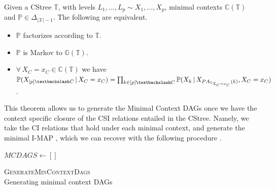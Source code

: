 \documentclass{tufte-book}
\begin{document}
\begin{theorem}\label{thm:markovtheoremcstrees}
Given a CStree $\mathbb{T}$, with levels $L_1,...,L_p \sim X_1,...,X_p$, minimal contexts $\mathbb{C}(\mathbb{T})$ and $\mathbb{P} \in \Delta_{|\mathcal{X}|-1}$. The following are equivalent.
\begin{itemize}
\item $\mathbb{P}$ factorizes according to $\mathbb{T}$.
\item $\mathbb{P}$ is Markov to $\mathbb{G}(\mathbb{T})$.
\item $\forall \, X_C = x_C \in \mathbb{C}(\mathbb{T})$ we have\\ $\mathbb{P}(X_{[p]\textbackslash C}\,|\,X_C=x_C) = \prod_{k \in [p]\textbackslash C} \mathbb{P}(X_k \, |\, X_{PA_{\mathbb{G}_{X_C=x_C}}(k)}, X_C=x_C)$.
\end{itemize}
\end{theorem}

This theorem allows us to generate the Minimal Context DAGs once we have the context specific closure of the CSI relations entailed in the CStree. Namely, we take the CI relations that hold under each minimal context, and generate the minimal I-MAP \cite{verma-1990-causal-networ}, which we can recover with the following procedure \cite{solus-2021-consis-guaran}.


\begin{algorithm}\label{alg:mcdags}
\SetAlgoLined
{}
$MCDAGS \gets []$\;

\caption{\textsc{GenerateMinContextDags} \\ Generating minimal context DAGs}
\end{algorithm}
\end{document}
